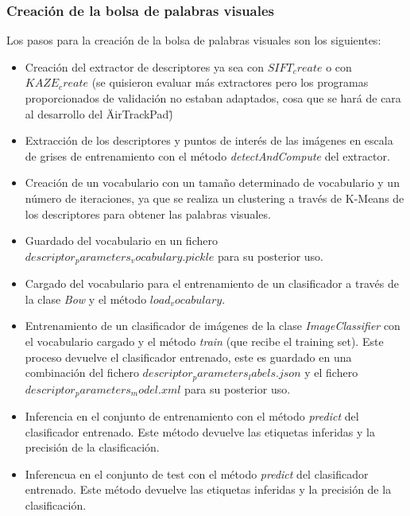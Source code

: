 \documentclass[a4paper,12pt]{article}
\begin{document}
{\vspace{0.5cm}

\subsubsection{Creación de la bolsa de palabras visuales}
Los pasos para la creación de la bolsa de palabras visuales son los siguientes:

\vspace{0.5cm}

\begin{itemize}
    \item Creación del extractor de descriptores ya sea con \textit{$SIFT_create$} o con \textit{$KAZE_create$} (se quisieron evaluar más extractores pero los programas proporcionados de validación no estaban adaptados, cosa que se hará de cara al desarrollo del \"AirTrackPad\")
    \item Extracción de los descriptores y puntos de interés de las imágenes en escala de grises de entrenamiento con el método \textit{detectAndCompute} del extractor.
    \item Creación de un vocabulario con un tamaño determinado de vocabulario y un número de iteraciones, ya que se realiza un clustering a través de K-Means de los descriptores para obtener las palabras visuales.
    \item Guardado del vocabulario en un fichero \textit{$descriptor_parameters_vocabulary.pickle$} para su posterior uso.
    \item Cargado del vocabulario para el entrenamiento de un clasificador a través de la clase \textit{Bow} y el método \textit{$load_vocabulary$}.
    \item Entrenamiento de un clasificador de imágenes de la clase \textit{ImageClassifier} con el vocabulario cargado y el método \textit{train} (que recibe el training set). Este proceso devuelve el clasificador entrenado, este es guardado en una combinación del fichero \textit{$descriptor_parameters_labels.json$} y el fichero \textit{$descriptor_parameters_model.xml$} para su posterior uso.
    \item Inferencia en el conjunto de entrenamiento con el método \textit{predict} del clasificador entrenado. Este método devuelve las etiquetas inferidas y la precisión de la clasificación.
    \item Inferencua en el conjunto de test con el método \textit{predict} del clasificador entrenado. Este método devuelve las etiquetas inferidas y la precisión de la clasificación.
\end{itemize}

}
\end{document}
